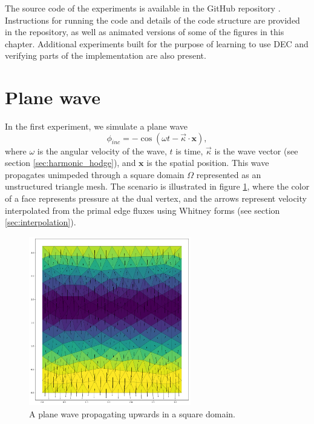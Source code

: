 \documentclass[utf8,english]{gradu3}
\begin{document}
The source code of the experiments is available
in the GitHub repository \parencite{myyra_wavepool_2023}.
Instructions for running the code
and details of the code structure are provided in the repository,
as well as animated versions of some of the figures in this chapter.
Additional experiments built for the purpose of learning to use DEC
and verifying parts of the implementation are also present.


\section{Plane wave}

In the first experiment, we simulate a plane wave
\begin{equation}\label{eq:incident_plane_wave}
  \phi_{inc} = -\cos(\omega t - \vec{\kappa} \cdot \mathbf{x}),
\end{equation}
where $\omega$ is the angular velocity of the wave,
$t$ is time, $\vec{\kappa}$ is the wave vector (see section \ref{sec:harmonic_hodge}),
and $\mathbf{x}$ is the spatial position.
This wave propagates unimpeded through a square domain $\Omega$
represented as an unstructured triangle mesh.
The scenario is illustrated in figure \ref{fig:plane_wave},
where the color of a face represents pressure at the dual vertex,
and the arrows represent velocity interpolated from the primal edge fluxes
using Whitney forms (see section \ref{sec:interpolation}).

\begin{figure}[h]
  \centering
  \includegraphics[width=200pt]{thesis/plane_wave.pdf}
  \caption{A plane wave propagating upwards in a square domain.}
  \label{fig:plane_wave}
\end{figure}
\end{document}
